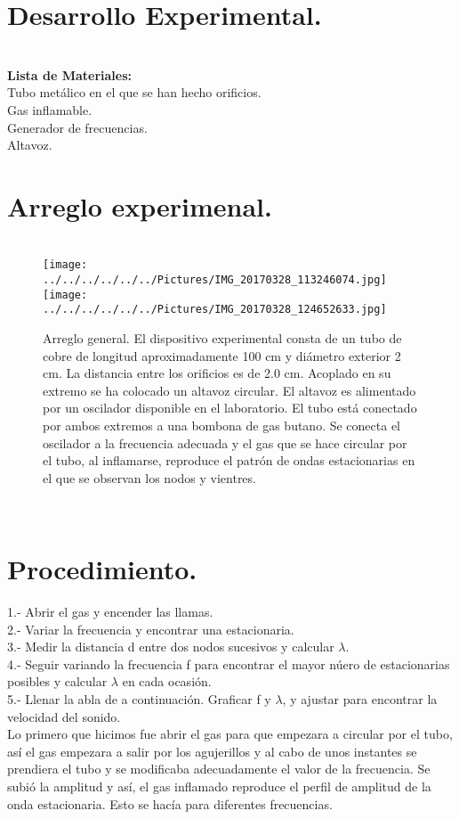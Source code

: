 \documentclass[10pt,a4paper]{article}
\begin{document}
\section*{Desarrollo Experimental.}\\
\textbf{Lista de Materiales:} \\
Tubo met\'{a}lico en el que se han hecho orificios.\\
Gas inflamable.\\
Generador de frecuencias.\\
Altavoz.\\

\section*{Arreglo experimenal.}
\begin{figure}[hbtp]
\centering
\\
 \texttt{[image: ../../../../../../Pictures/IMG\_20170328\_113246074.jpg]} 
 \texttt{[image: ../../../../../../Pictures/IMG\_20170328\_124652633.jpg]} 
\caption{Arreglo general. El dispositivo experimental consta de un tubo de cobre de longitud aproximadamente 100 cm y di\'{a}metro exterior 2 cm. La distancia entre los orificios es de 2.0 cm. Acoplado en su extremo se ha colocado un altavoz circular. El altavoz es alimentado por un oscilador disponible en el laboratorio. El tubo est\'{a} conectado por ambos extremos a una bombona de gas butano. Se conecta el oscilador a la frecuencia adecuada y el gas que se hace circular por el tubo, al inflamarse, reproduce el patr\'{o}n de ondas estacionarias en el que se observan los nodos y vientres. }
\end{figure} 
\\

\section*{Procedimiento.}
1.- Abrir el gas y encender las llamas.\\
2.-	Variar la frecuencia y encontrar una estacionaria.\\
3.- Medir la distancia d entre dos nodos sucesivos y calcular $\lambda$.\\
4.- Seguir variando la frecuencia f para encontrar el mayor n\'{u}ero de estacionarias posibles y calcular $\lambda$ en cada ocasi\'{o}n. \\
5.- Llenar la abla de a continuaci\'{o}n. Graficar f y $\lambda$, y ajustar para encontrar la velocidad del sonido.\\
Lo primero que hicimos fue abrir el gas para que empezara a circular por el tubo, as\'{i} el gas empezara a salir por los agujerillos y al cabo de unos instantes se prendiera el tubo y se modificaba adecuadamente el valor de la frecuencia. Se subi\'{o} la amplitud y as\'{i}, el gas inflamado reproduce el perfil de amplitud de la onda estacionaria. Esto se hac\'{i}a para diferentes frecuencias.
\medskip
\end{document}
